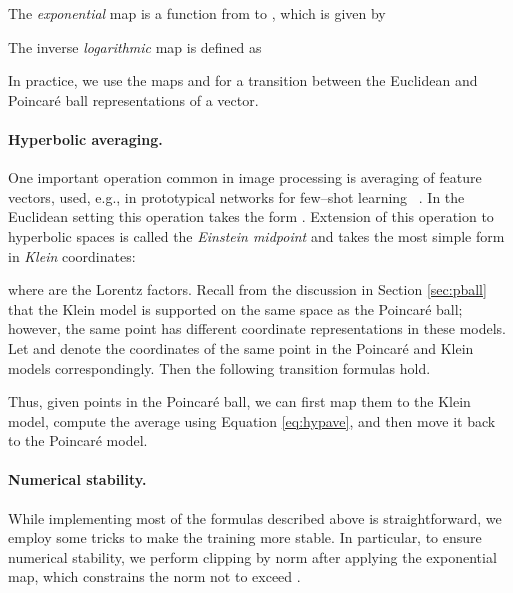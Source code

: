 \documentclass[10pt,twocolumn,letterpaper]{article}
\begin{document}
The \emph{exponential} map  is a function from \mbox{} to , which is given by


The inverse \emph{logarithmic} map is defined as
















In practice, we use the maps  and  for a transition between the Euclidean and Poincar\'e ball representations of a vector.


\paragraph{Hyperbolic averaging.}
One important operation common in image processing is averaging of feature vectors, used, e.g., in prototypical networks for few--shot learning ~\cite{snell2017prototypical_net}. In the Euclidean setting this operation takes the form . Extension of this operation to hyperbolic spaces is called the \emph{Einstein midpoint} and takes the most simple form in \emph{Klein} coordinates:

where  are the Lorentz factors. Recall from the discussion in Section \ref{sec:pball} that the Klein model is supported on the same space as the Poincar\'e ball; however, the same point has different coordinate representations in these models. Let  and  denote the coordinates of the same point in the Poincar\'e and Klein models correspondingly. Then the following transition formulas hold.

Thus, given points in the Poincar\'e ball, we can first map them to the Klein model, compute the average using Equation \eqref{eq:hypave}, and then move it back to the Poincar\'e model.

\paragraph{Numerical stability.}
While implementing most of the formulas described above is straightforward, we employ some tricks to make the training more stable. In particular, to ensure numerical stability, we perform clipping by norm after applying the exponential map, which constrains the norm not to exceed .
\end{document}
